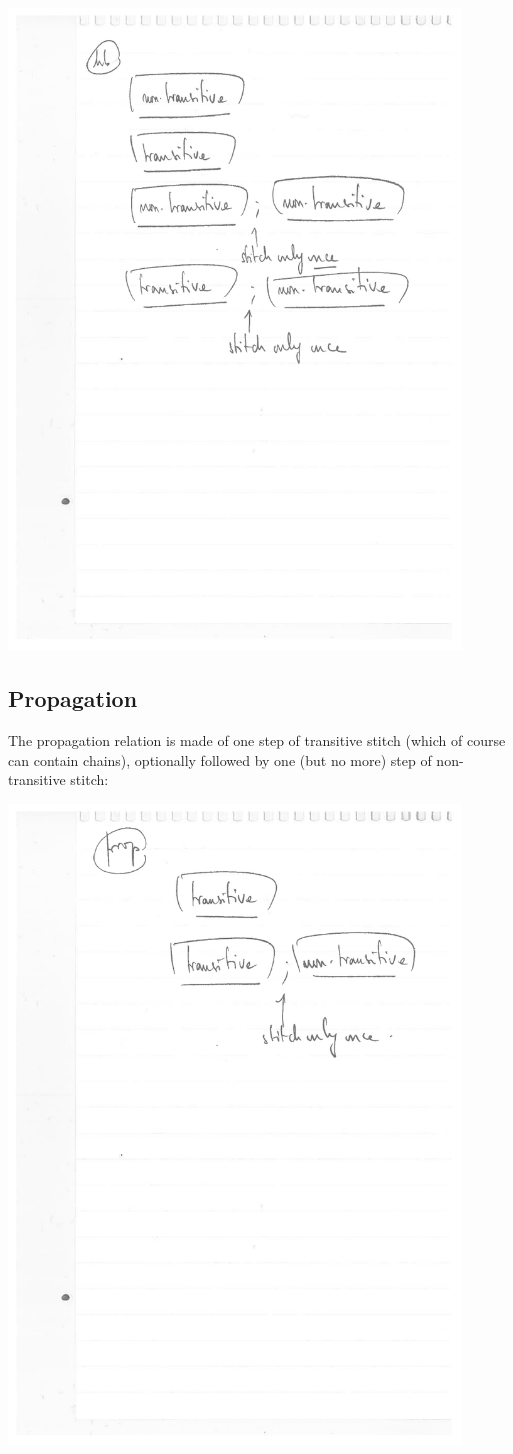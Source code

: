 \documentclass[a4paper]{article}
\begin{document}
\includegraphics[width=12cm]{hb-stitch}

\pagebreak

\subsection{Propagation}

The propagation relation is made of one step of transitive stitch (which of
course can contain chains), optionally followed by one (but no more) step of
non-transitive stitch:

\includegraphics[width=12cm]{prop-stitch}
\end{document}
